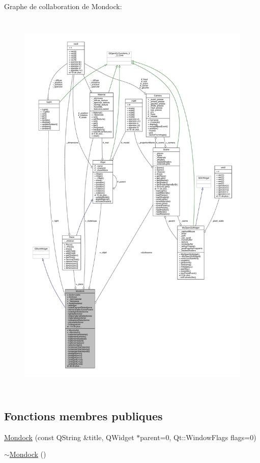 Graphe de collaboration de Mondock\+:
\nopagebreak
\begin{figure}[H]
\begin{center}
\leavevmode
\includegraphics[height=550pt]{class_mondock__coll__graph}
\end{center}
\end{figure}
\subsection*{Fonctions membres publiques}
\begin{DoxyCompactItemize}
\item 
\hyperlink{class_mondock_a31297333af7c87f4f9773728db845d7f}{Mondock} (const Q\+String \&title, Q\+Widget $\ast$parent=0, Qt\+::\+Window\+Flags flags=0)
\item 
\hyperlink{class_mondock_a33aa83a1e0de9cf10380c1a5237eec7e}{$\sim$\+Mondock} ()
\end{DoxyCompactItemize}
